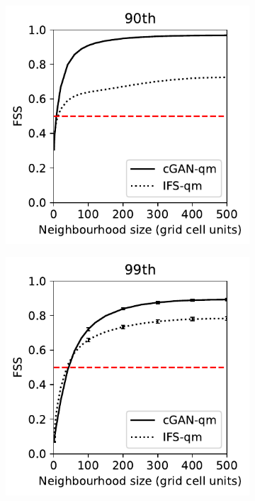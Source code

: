 \documentclass[../main.tex]{subfiles}
\begin{document}
\begin{figure}[t]
    \centering
     \begin{subfigure}[t]{0.32\textwidth}
    \centering
 \includegraphics[width=\textwidth]{images/fss_q90th_final-nologs_217600.pdf}
     \caption{}
     \end{subfigure}
     \centering
     \begin{subfigure}[t]{0.32\textwidth}
     \includegraphics[width=\textwidth]{images/fss_q99th_final-nologs_217600.pdf}

\end{subfigure}
\end{figure}
\end{document}

